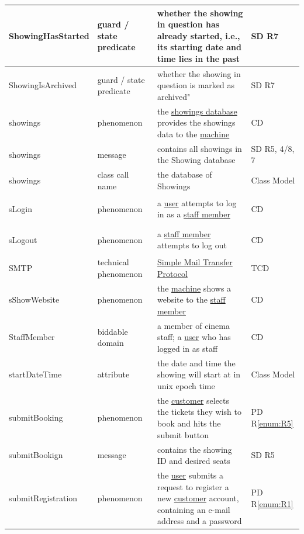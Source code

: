 \documentclass[a4paper,10pt,titlepage,bibtotoc,bibtotocnumbered]{scrreprt}
\begin{document}
\begin{longtable}{|p{4.75cm}|p{3cm}|p{5cm}|l|}
\hline
ShowingHasStarted & guard / state predicate & whether the showing in question has already started, i.e., its starting date and time lies in the past & SD R7\\
\hline
ShowingIsArchived & guard / state predicate & whether the showing in question is marked as archived" & SD R7\\
\hline
\hypertarget{glossary:showings}{showings} & phenomenon & the \hyperlink{glossary:Showing}{showings database} provides the showings data to the \hyperlink{glossary:UDEKino}{machine} & CD\\
\hline
showings & message & contains all showings in the Showing database & SD R5, 4/8, 7\\
\hline
showings & class call name & the database of Showings & Class Model\\
\hypertarget{glossary:sLogin}{sLogin} & phenomenon & a \hyperlink{glossary:User}{user} attempts to log in as a \hyperlink{glossary:StaffMember}{staff member} & CD\\
\hline
\hypertarget{glossary:sLogout}{sLogout} & phenomenon & a \hyperlink{glossary:StaffMember}{staff member} attempts to log out & CD\\
\hline
SMTP & technical phenomenon & \href{http://tools.ietf.org/html/rfc2821}{Simple Mail Transfer Protocol} & TCD\\
\hline
\hypertarget{glossary:sShowWebsite}{sShowWebsite} & phenomenon & the \hyperlink{glossary:UDEKino}{machine} shows a website to the \hyperlink{glossary:StaffMember}{staff member} & CD\\
\hline
\hypertarget{glossary:StaffMember}{StaffMember} & biddable domain & a member of cinema staff; a \hyperlink{glossary:User}{user} who has logged in as staff & CD\\
\hline
startDateTime & attribute & the date and time the showing will start at in unix epoch time & Class Model\\
\hline
\hypertarget{glossary:submitBooking}{submitBooking} & phenomenon & the \hyperlink{glossary:Customer}{customer} selects the tickets they wish to book and hits the submit button &  PD R\ref{enum:R5}\\
\hline
submitBookign & message & contains the showing ID and desired seats & SD R5\\
\hline
\hypertarget{glossary:submitRegistration}{submitRegistration} & phenomenon & the \hyperlink{glossary:User}{user} submits a request to register a new \hyperlink{glossary:Customer}{customer} account, containing an e-mail address and a password & PD R\ref{enum:R1}\\

\end{longtable}
\end{document}
